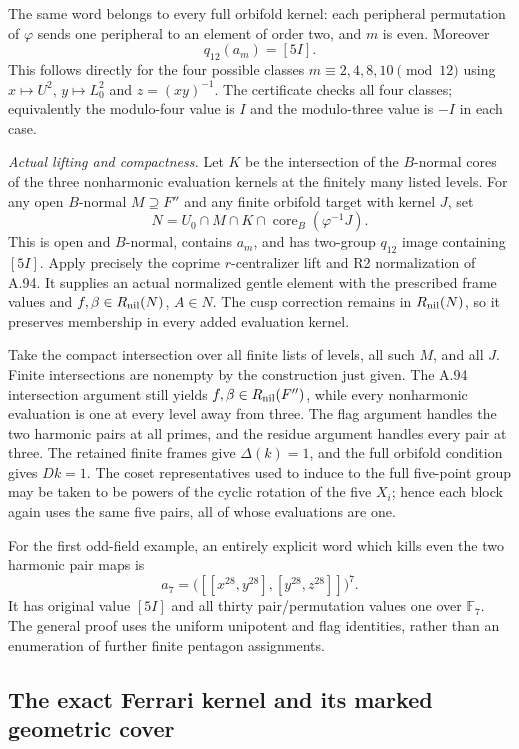 The same word belongs to every full orbifold kernel:
each peripheral permutation of $\varphi$ sends one peripheral
to an element of order two, and $m$ is even. Moreover
\[
                       q_{12}(a_m)=[5I].
\]
This follows directly for the four possible classes
$m\equiv2,4,8,10\pmod{12}$ using
$x\mapsto U^2$, $y\mapsto L_0^2$ and $z=(xy)^{-1}$.
The certificate checks all four classes; equivalently the
modulo-four value is $I$ and the modulo-three value is
$-I$ in each case.

\emph{Actual lifting and compactness.}
Let $K$ be the intersection of the $B$-normal cores of the
three nonharmonic evaluation kernels at the finitely many
listed levels. For any open $B$-normal $M\supseteq F''$
and any finite orbifold target with kernel $J$, set
\[
 N=U_0\cap M\cap K\cap
                   \operatorname{core}_B(\varphi^{-1}J).
\]
This is open and $B$-normal, contains $a_m$, and has
two-group $q_{12}$ image containing $[5I]$.
Apply precisely the coprime $r$-centralizer lift and R2
normalization of A.94. It supplies an actual normalized
gentle element with the prescribed frame values and
$f,\beta\in R_{\rm nil}(N)$, $A\in N$.
The cusp correction remains in $R_{\rm nil}(N)$, so
it preserves membership in every added evaluation kernel.

Take the compact intersection over all finite lists of
levels, all such $M$, and all $J$. Finite intersections
are nonempty by the construction just given. The A.94
intersection argument still yields
$f,\beta\in R_{\rm nil}(F'')$, while every nonharmonic
evaluation is one at every level away from three.
The flag argument handles the two harmonic pairs at all
primes, and the residue argument handles every pair at
three. The retained finite frames give $\Delta(k)=1$,
and the full orbifold condition gives $Dk=1$.
The coset representatives used to induce to the full
five-point group may be taken to be powers of the cyclic
rotation of the five $X_i$; hence each block again uses
the same five pairs, all of whose evaluations are one.

For the first odd-field example, an entirely explicit word
which kills even the two harmonic pair maps is
\[
              a_7=\bigl([[x^{28},y^{28}],
                              [y^{28},z^{28}]]\bigr)^7.
\]
It has original value $[5I]$ and all thirty pair/permutation
values one over $\mathbb F_7$. The general proof uses
the uniform unipotent and flag identities, rather than an
enumeration of further finite pentagon assignments.

\subsection{The exact Ferrari kernel and its marked geometric cover}


